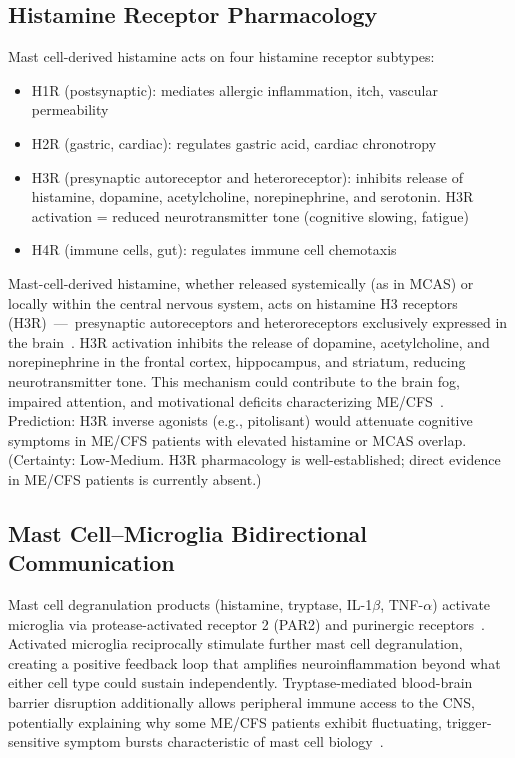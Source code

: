 \subsection{Histamine Receptor Pharmacology}

Mast cell-derived histamine acts on four histamine receptor subtypes:
\begin{itemize}
  \item H1R (postsynaptic): mediates allergic inflammation, itch, vascular permeability
  \item H2R (gastric, cardiac): regulates gastric acid, cardiac chronotropy
  \item H3R (presynaptic autoreceptor and heteroreceptor): inhibits release of histamine, dopamine, acetylcholine, norepinephrine, and serotonin. H3R activation = reduced neurotransmitter tone (cognitive slowing, fatigue)
  \item H4R (immune cells, gut): regulates immune cell chemotaxis
\end{itemize}

\begin{hypothesis}
\label{hyp:ch15-mastcell-H3receptor}
Mast-cell-derived histamine, whether released systemically (as in MCAS) or locally within the central nervous system, acts on histamine H3 receptors (H3R)~---~presynaptic autoreceptors and heteroreceptors exclusively expressed in the brain~\cite{Abdulrazzaq2022H3receptor}. H3R activation inhibits the release of dopamine, acetylcholine, and norepinephrine in the frontal cortex, hippocampus, and striatum, reducing neurotransmitter tone. This mechanism could contribute to the brain fog, impaired attention, and motivational deficits characterizing ME/CFS~\cite{Abdulrazzaq2022H3receptor, Novak2022}.
Prediction: H3R inverse agonists (e.g., pitolisant) would attenuate cognitive symptoms in ME/CFS patients with elevated histamine or MCAS overlap.
(Certainty: Low-Medium. H3R pharmacology is well-established; direct evidence in ME/CFS patients is currently absent.)
\end{hypothesis}

\subsection{Mast Cell--Microglia Bidirectional Communication}

Mast cell degranulation products (histamine, tryptase, IL-1$\beta$, TNF-$\alpha$) activate microglia via protease-activated receptor 2 (PAR2) and purinergic receptors~\cite{Lakatos2025mastMicroglia, Kempuraj2016neuroinflammation}. Activated microglia reciprocally stimulate further mast cell degranulation, creating a positive feedback loop that amplifies neuroinflammation beyond what either cell type could sustain independently. Tryptase-mediated blood-brain barrier disruption additionally allows peripheral immune access to the CNS, potentially explaining why some ME/CFS patients exhibit fluctuating, trigger-sensitive symptom bursts characteristic of mast cell biology~\cite{Frioni2025MCAS, Zhang2024MastBrain}.

